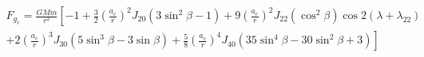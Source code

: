 \documentclass[10pt]{article}
\begin{document}
\begin{align*}F_{g_r}
= \frac{GMm}{r^2} 
\left[ 
- 1
+ \frac{3}{2} \left( \frac{a_{e}}{r} \right)^2 J_{20} \left( 3 \sin^2 \beta - 1 \right)
+ 9 \left( \frac{a_{e}}{r} \right)^2 J_{22} \left( \cos^2 \beta \right) \cos 2 \left( \lambda + \lambda_{22} \right)
\right.
\\
\left.
+ 2 \left( \frac{a_{e}}{r} \right)^3 J_{30} \left( 5 \sin^3 \beta - 3 \sin \beta \right)
+ \frac{5}{8} \left( \frac{a_{e}}{r} \right)^4 J_{40} \left( 35 \sin^4 \beta -30 \sin^2 \beta + 3  \right)
\right]\end{align*}
\end{document}
